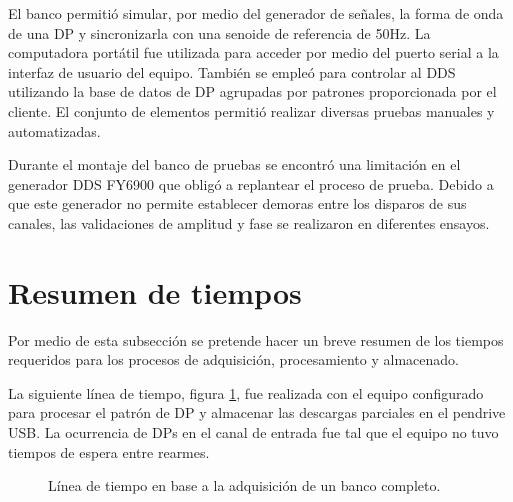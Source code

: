 El banco permitió simular, por medio del generador de señales, la forma de onda de una DP y sincronizarla con una senoide de referencia de 50Hz. La computadora portátil fue utilizada para acceder por medio del puerto serial a la interfaz de usuario del equipo. También se empleó para controlar al DDS utilizando la base de datos de DP agrupadas por patrones proporcionada por el cliente.
El conjunto de elementos permitió realizar diversas pruebas manuales y automatizadas.

Durante el montaje del banco de pruebas se encontró una limitación en el generador DDS FY6900 que obligó a replantear el proceso de prueba. Debido a que este generador no permite establecer demoras entre los disparos de sus canales, las validaciones de amplitud y fase se realizaron en diferentes ensayos.

\section{Resumen de tiempos}

Por medio de esta subsección se pretende hacer un breve resumen de los tiempos requeridos para los procesos de adquisición, procesamiento y almacenado.

La siguiente línea de tiempo, figura \ref{fig:lineaDeTiempo}, fue realizada con el equipo configurado para procesar el patrón de DP y almacenar las descargas parciales en el pendrive USB. La ocurrencia de DPs en el canal de entrada fue tal que el equipo no tuvo tiempos de espera entre rearmes.

\vspace{5mm}
\begin{figure}[ht]
\caption{Línea de tiempo en base a la adquisición de un banco completo.}
\label{fig:lineaDeTiempo}
\end{figure}


